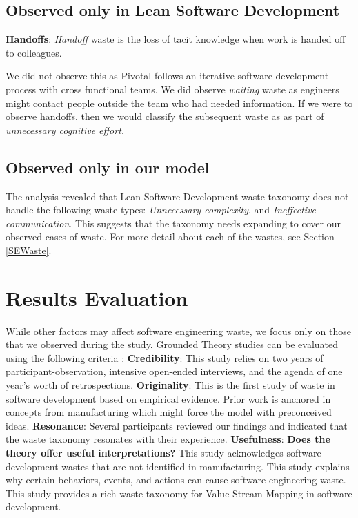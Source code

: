 \subsection{Observed only in Lean Software Development}

\textbf{Handoffs}: \textit{Handoff} waste is the loss of tacit knowledge when work is handed off to colleagues.

We did not observe this as Pivotal follows an iterative software development process with cross functional teams. We did observe \textit{waiting} waste as engineers might contact people outside the team who had needed information. If we were to observe handoffs, then we would classify the subsequent waste as  as part of \textit{unnecessary cognitive effort.} 
\subsection{Observed only in our model}
The analysis revealed that Lean Software Development waste taxonomy does not handle the following waste types: \textit{Unnecessary complexity}, and \textit{Ineffective communication}. This suggests that the taxonomy needs expanding to cover our observed cases of waste. For more detail about each of the wastes, see Section \ref{SEWaste}.
\section{Results Evaluation}
\label{ResultsEvaluation}
While other factors may affect software engineering waste, we focus only on those that we observed during the study. Grounded Theory studies can be evaluated using the following criteria \cite{Charmaz, StolGroundedTheory}:
\textbf{Credibility}:   This study relies on two years of participant-observation, \numberOfInterviews{} intensive open-ended interviews, and the agenda of one year's worth of retrospections. 
\textbf{Originality}:   This is the first study of waste in software development based on empirical evidence. Prior work is anchored in concepts from manufacturing which might force the model with preconceived ideas. 
\textbf{Resonance}:  Several participants reviewed our findings and indicated that the waste taxonomy resonates with their experience.
\textbf{Usefulness}: \textbf{Does the theory offer useful interpretations?} This study acknowledges software development wastes that are not identified in manufacturing. This study explains why certain behaviors, events, and actions can cause software engineering waste. This study provides a rich waste taxonomy for Value Stream Mapping in software development. 

